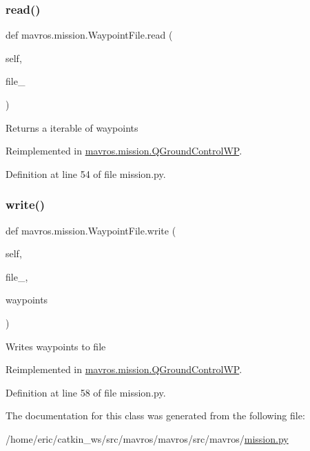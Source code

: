\subsubsection{\texorpdfstring{read()}{read()}}
{\footnotesize\ttfamily def mavros.\+mission.\+Waypoint\+File.\+read (\begin{DoxyParamCaption}\item[{}]{self,  }\item[{}]{file\+\_\+ }\end{DoxyParamCaption})}

\begin{DoxyVerb}Returns a iterable of waypoints\end{DoxyVerb}
 

Reimplemented in \mbox{\hyperlink{classmavros_1_1mission_1_1QGroundControlWP_a6b06e2e1e92496e9d0eeb304d2702181}{mavros.\+mission.\+Q\+Ground\+Control\+WP}}.



Definition at line 54 of file mission.\+py.

\mbox{\label{classmavros_1_1mission_1_1WaypointFile_a04d4ed37ce9357a0467ef9226296cb49}} 
\subsubsection{\texorpdfstring{write()}{write()}}
{\footnotesize\ttfamily def mavros.\+mission.\+Waypoint\+File.\+write (\begin{DoxyParamCaption}\item[{}]{self,  }\item[{}]{file\+\_\+,  }\item[{}]{waypoints }\end{DoxyParamCaption})}

\begin{DoxyVerb}Writes waypoints to file\end{DoxyVerb}
 

Reimplemented in \mbox{\hyperlink{classmavros_1_1mission_1_1QGroundControlWP_a3ade3c33ce488e4f5fb361bfe7ff8e2d}{mavros.\+mission.\+Q\+Ground\+Control\+WP}}.



Definition at line 58 of file mission.\+py.



The documentation for this class was generated from the following file\+:\begin{DoxyCompactItemize}
\item 
/home/eric/catkin\+\_\+ws/src/mavros/mavros/src/mavros/\mbox{\hyperlink{mission_8py}{mission.\+py}}\end{DoxyCompactItemize}
